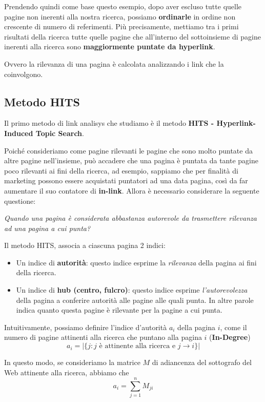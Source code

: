 Prendendo quindi come base questo esempio, dopo aver escluso tutte quelle pagine non inerenti alla nostra ricerca, possiamo \textbf{ordinarle} in ordine non crescente di numero di referimenti. Più precisamente, mettiamo tra i primi risultati della ricerca tutte quelle pagine che all'interno del sottoinsieme di pagine inerenti alla ricerca sono \textbf{maggiormente puntate da hyperlink}.

Ovvero la rilevanza di una pagina è calcolata analizzando i link che la coinvolgono.

\subsection{Metodo HITS}

Il primo metodo di link analisys che studiamo è il  metodo \textbf{HITS - Hyperlink-Induced Topic Search}.

Poiché consideriamo come pagine rilevanti le pagine che sono molto puntate da altre pagine nell'insieme, può accadere che una pagina è puntata da tante pagine poco rilevanti ai fini della ricerca, ad esempio, sappiamo che per finalità di marketing possono essere acquistati puntatori
ad una data pagina, così da far aumentare il suo contatore di \textbf{in-link}. Allora è necessario considerare la seguente questione:

\textit{Quando una pagina è considerata abbastanza autorevole da trasmettere rilevanza ad una pagina a cui punta?}

Il metodo HITS, associa a ciascuna pagina 2 indici:

\begin{itemize}
    \item Un indice di \textbf{autorità}: questo indice esprime la \textit{rilevanza} della pagina ai fini della ricerca.
    \item Un indice di \textbf{hub (centro, fulcro)}: questo indice esprime \textit{l'autorevolezza} della pagina a conferire autorità alle pagine alle quali punta. In altre parole indica quanto questa pagine è rilevante per la pagine a cui punta.
\end{itemize}

Intuitivamente, possiamo definire l'indice d'autorità $a_i$ della pagina $i$, come il numero di pagine attinenti alla ricerca che puntano alla pagina $i$ (\textbf{In-Degree})
\[
    a_i = |\{j: j \text{ è attinente alla ricerca e } j \rightarrow i\}|
\]

In questo modo, se consideriamo la matrice $M$ di adiancenza del sottografo del Web attinente alla ricerca, abbiamo che
\[
a_i = \sum_{j=1}^n M_{ji}
\]

